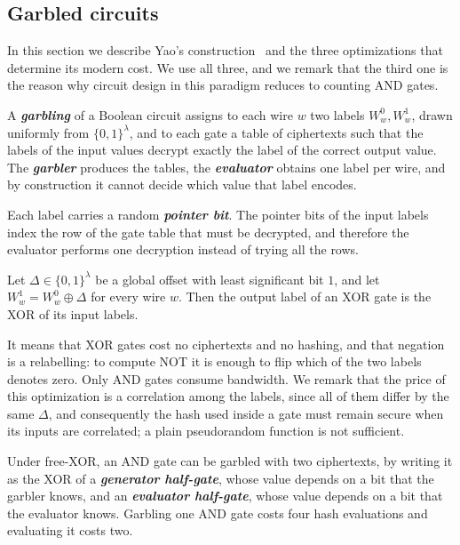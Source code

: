 \documentclass[11pt]{article}
\newcommand{\ib}[1]{\textbf{\emph{#1}}}
\begin{document}
\subsection{Garbled circuits}
\label{sec:prelim:gc}

In this section we describe Yao's construction~\cite{Yao} and the three optimizations that
determine its modern cost. We use all three, and we remark that the third one is the reason
why circuit design in this paradigm reduces to counting AND gates.

\begin{definition}
\label{def:garbling}
A \ib{garbling} of a Boolean circuit assigns to each wire $w$ two labels $W_w^0,W_w^1$,
drawn uniformly from $\{0,1\}^{\lambda}$, and to each gate a table of ciphertexts such that the
labels of the input values decrypt exactly the label of the correct output value. The
\ib{garbler} produces the tables, the \ib{evaluator} obtains one label per wire, and by
construction it cannot decide which value that label encodes.
\end{definition}

\begin{definition}
\label{def:pnp}
Each label carries a random \ib{pointer bit}. The pointer bits of the input labels index
the row of the gate table that must be decrypted, and therefore the evaluator performs one
decryption instead of trying all the rows.
\end{definition}

\begin{definition}
\label{def:freexor}
Let $\Delta \in \{0,1\}^{\lambda}$ be a global offset with least significant bit $1$, and
let $W_w^1 = W_w^0 \oplus \Delta$ for every wire $w$. Then the output label of an XOR gate
is the XOR of its input labels.
\end{definition}

It means that XOR gates cost no ciphertexts and no hashing, and that negation is a
relabelling: to compute NOT it is enough to flip which of the two labels denotes zero. Only
AND gates consume bandwidth. We remark that the price of this optimization is a correlation
among the labels, since all of them differ by the same $\Delta$, and consequently the hash
used inside a gate must remain secure when its inputs are correlated; a plain
pseudorandom function is not sufficient.

\begin{theorem}
\label{thm:halfgates}
Under free-XOR, an AND gate can be garbled with two ciphertexts, by writing it as the XOR of a
\ib{generator half-gate}, whose value depends on a bit that the garbler knows, and an
\ib{evaluator half-gate}, whose value depends on a bit that the evaluator knows. Garbling one
AND gate costs four hash evaluations and evaluating it costs two.
\end{theorem}
\end{document}
